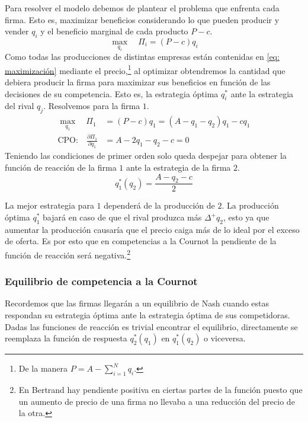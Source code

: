 Para resolver el modelo debemos de plantear el problema que enfrenta cada firma. Esto es, maximizar beneficios considerando lo que pueden producir y vender $q_i$ y el beneficio marginal de cada producto $P-c$.
\begin{equation}
    \max_{q_i} \quad \Pi _i = (P-c)q_i \label{eq: maximización}
\end{equation}
Como todas las producciones de distintas empresas están contenidas en \ref{eq: maximización} mediante el precio,\footnote{De la manera $P = A-\sum_{i = 1}^Nq_i$.} al optimizar obtendremos la cantidad que debiera producir la firma para maximizar sus beneficios en función de las decisiones de su competencia. Esto es, la estrategia óptima $q_i^*$ ante la estrategia del rival $q_j$. Resolvemos para la firma $1$.
\begin{align*}
\max_{q_1} \quad \Pi_1 &= (P-c)q_1 = (A-q_1-q_2)q_1 - cq_1 \\
\text{CPO:} \quad \frac{\partial \Pi_1}{\partial q_1} &= A-2q_1 - q_2 -c =0
\end{align*}
Teniendo las condiciones de primer orden solo queda despejar para obtener la función de reacción de la firma $1$ ante la estrategia de la firma $2$.
\begin{equation}
    q^*_1(q_2) = \frac{A-q_2-c}{2} \label{eq: Función de reacción 1}
\end{equation}

La mejor estrategia para $1$ dependerá de la producción de $2$. La producción óptima $q^*_1$ bajará en caso de que el rival produzca más $\Delta^+ q_2$, esto ya que aumentar la producción causaría que el precio caiga más de lo ideal por el exceso de oferta. Es por esto que en competencias a la Cournot la pendiente de la función de reacción será negativa.\footnote{En Bertrand hay pendiente positiva en ciertas partes de la función puesto que un aumento de precio de una firma no llevaba a una reducción del precio de la otra.}

\subsubsection{Equilibrio de competencia a la Cournot} 

Recordemos que las firmas llegarán a un equilibrio de Nash cuando estas respondan su estrategia óptima ante la estrategia óptima de sus competidoras. Dadas las funciones de reacción es trivial encontrar el equilibrio, directamente se reemplaza la función de respuesta $q^*_2(q_1)$ en $q^*_1(q_2)$ o viceversa.

